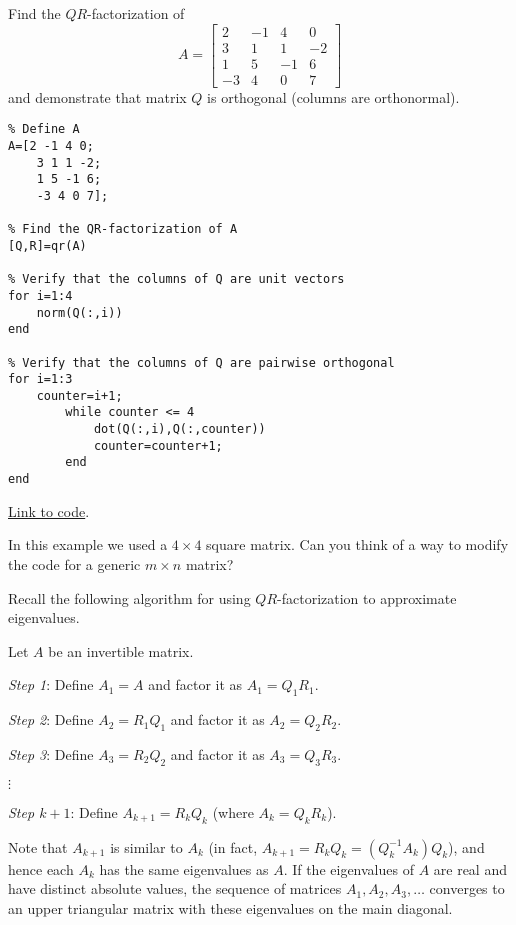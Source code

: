 \documentclass{ximera}
\begin{document}
\begin{example}\label{ex:qrOrthonormalQ}
Find the $QR$-factorization of 
$$A=\begin{bmatrix}2 & -1 & 4 & 0\\
    3 & 1 & 1 & -2\\
    1 & 5 & -1 & 6\\
    -3 & 4 & 0 & 7\end{bmatrix}$$
and demonstrate that matrix $Q$ is orthogonal (columns are orthonormal).     
\begin{explanation}
    \begin{verbatim}
% Define A
A=[2 -1 4 0;
    3 1 1 -2;
    1 5 -1 6;
    -3 4 0 7];

% Find the QR-factorization of A
[Q,R]=qr(A)

% Verify that the columns of Q are unit vectors
for i=1:4
    norm(Q(:,i))
end    

% Verify that the columns of Q are pairwise orthogonal
for i=1:3
    counter=i+1;
        while counter <= 4
            dot(Q(:,i),Q(:,counter))
            counter=counter+1;
        end
end
    \end{verbatim}
  

\href{https://sagecell.sagemath.org/?z=eJyNj0FrwzAMhe-B_Id3KaQsgbnJNuiaQ2Dsnh52KT2Y1F4EqdU5zsr262c3Lt1uezoIoadP0gIvSpNRaNKkqXcrFAIV7p_TBF4lhI9iFUuBh9B_jGVRBiue9r5OkwVeyRzgeoV2W2jZObb0LR2xAevA37X5dl9_2KxZzgNvypL-8iPSXeY6HqajGYO9hbQKkyGHTxVQY5potqBarKt5vWF7zNpsndPS85Tf7fVP8EmSPdOowNb1_M5GDjd-OfM7noxTtqY7ER8OOvc0qGsPmxrVrRd0YBePykOKxnDhb9eVHfOfDf6Tyzs_gYRr4g==&lang=octave&interacts=eJyLjgUAARUAuQ==}{Link to code}.
\end{explanation}  
In this example we used a $4\times 4$ square matrix.  Can you think of a way to modify the code for a generic $m\times n$ matrix?
\end{example}

Recall the following algorithm for using $QR$-factorization to approximate eigenvalues.

\begin{algorithm}[\ref{alg:qrEig}]
Let $A$ be an invertible matrix.

\emph{Step 1}: Define $A_{1} = A$ and factor it as $A_{1} = Q_{1}R_{1}$.

\emph{Step 2}: Define $A_{2} = R_{1}Q_{1}$ and factor it as $A_{2} = Q_{2}R_{2}$.

\emph{Step 3}: Define $A_{3} = R_{2}Q_{2}$ and factor it as $A_{3} = Q_{3}R_{3}$.

 $\vdots$
 
\emph{Step $k+1$}: Define $A_{k + 1} = R_{k}Q_{k}$ (where $A_{k} = Q_{k}R_{k}$). 

Note that $A_{k + 1}$ is similar to $A_{k}$ (in fact, $A_{k+1} = R_{k}Q_{k} = (Q_{k}^{-1}A_{k})Q_{k}$), and hence each $A_{k}$ has the same eigenvalues as $A$. If the eigenvalues of $A$ are real and have distinct absolute values, the sequence of matrices $A_{1}, A_{2}, A_{3}, \dots$ converges to an upper triangular matrix with these eigenvalues on the main diagonal. 
\end{algorithm}
\end{document}
